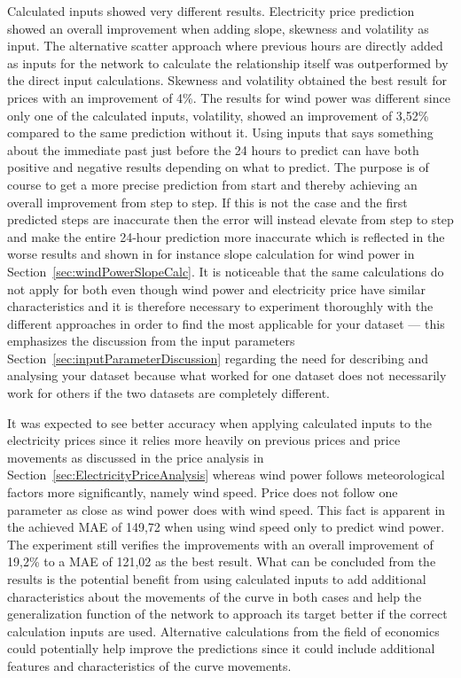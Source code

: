 Calculated inputs showed very different results. Electricity price prediction showed an overall improvement when adding slope, skewness and volatility as input. The alternative scatter approach where previous hours are directly added as inputs for the network to calculate the relationship itself was outperformed by the direct input calculations. Skewness and volatility obtained the best result for prices with an improvement of 4\%. The results for wind power was different since only one of the calculated inputs, volatility, showed an improvement of 3,52\% compared to the same prediction without it. Using inputs that says something about the immediate past just before the 24 hours to predict can have both positive and negative results depending on what to predict. The purpose is of course to get a more precise prediction from start and thereby achieving an overall improvement from step to step. If this is not the case and the first predicted steps are inaccurate then the error will instead elevate from step to step and make the entire 24-hour prediction more inaccurate which is reflected in the worse results and shown in for instance slope calculation for wind power in Section~\ref{sec:windPowerSlopeCalc}. It is noticeable that the same calculations do not apply for both even though wind power and electricity price have similar characteristics and it is therefore necessary to experiment thoroughly with the different approaches in order to find the most applicable for your dataset --- this emphasizes the discussion from the input parameters Section~\ref{sec:inputParameterDiscussion} regarding the need for describing and analysing your dataset because what worked for one dataset does not necessarily work for others if the two datasets are completely different. 

It was expected to see better accuracy when applying calculated inputs to the electricity prices since it relies more heavily on previous prices and price movements as discussed in the price analysis in Section~\ref{sec:ElectricityPriceAnalysis} whereas wind power follows meteorological factors more significantly, namely wind speed. Price does not follow one parameter as close as wind power does with wind speed. This fact is apparent in the achieved MAE of 149,72 when using wind speed only to predict wind power. The experiment still verifies the improvements with an overall improvement of 19,2\% to a MAE of 121,02 as the best result. What can be concluded from the results is the potential benefit from using calculated inputs to add additional characteristics about the movements of the curve in both cases and help the generalization function of the network to approach its target better if the correct calculation inputs are used. Alternative calculations from the field of economics could potentially help improve the predictions since it could include additional features and characteristics of the curve movements. 